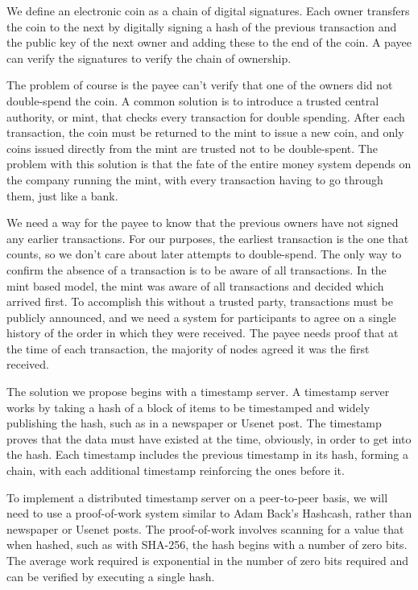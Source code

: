 \documentclass{article}
\begin{document}
We define an electronic coin as a chain of digital signatures. Each owner transfers the coin to the next by digitally signing a hash of the previous transaction and the public key of the next owner and adding these to the end of the coin. A payee can verify the signatures to verify the chain of ownership.

The problem of course is the payee can't verify that one of the owners did not double-spend the coin. A common solution is to introduce a trusted central authority, or mint, that checks every transaction for double spending. After each transaction, the coin must be returned to the mint to issue a new coin, and only coins issued directly from the mint are trusted not to be double-spent. The problem with this solution is that the fate of the entire money system depends on the company running the mint, with every transaction having to go through them, just like a bank.

We need a way for the payee to know that the previous owners have not signed any earlier transactions. For our purposes, the earliest transaction is the one that counts, so we don't care about later attempts to double-spend. The only way to confirm the absence of a transaction is to be aware of all transactions. In the mint based model, the mint was aware of all transactions and decided which arrived first. To accomplish this without a trusted party, transactions must be publicly announced, and we need a system for participants to agree on a single history of the order in which they were received. The payee needs proof that at the time of each transaction, the majority of nodes agreed it was the first received.

The solution we propose begins with a timestamp server. A timestamp server works by taking a hash of a block of items to be timestamped and widely publishing the hash, such as in a newspaper or Usenet post. The timestamp proves that the data must have existed at the time, obviously, in order to get into the hash. Each timestamp includes the previous timestamp in its hash, forming a chain, with each additional timestamp reinforcing the ones before it.

To implement a distributed timestamp server on a peer-to-peer basis, we will need to use a proof-of-work system similar to Adam Back's Hashcash, rather than newspaper or Usenet posts. The proof-of-work involves scanning for a value that when hashed, such as with SHA-256, the hash begins with a number of zero bits. The average work required is exponential in the number of zero bits required and can be verified by executing a single hash.
\end{document}
